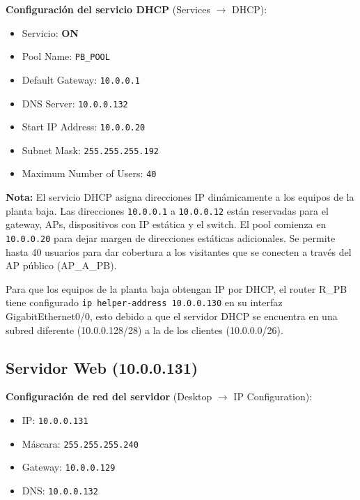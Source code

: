 \documentclass[letterpaper,11pt]{article}
\begin{document}
\textbf{Configuración del servicio DHCP} (Services $\rightarrow$ DHCP):
\begin{itemize}
    \item Servicio: \textbf{ON}
    \item Pool Name: \texttt{PB\_POOL}
    \item Default Gateway: \texttt{10.0.0.1}
    \item DNS Server: \texttt{10.0.0.132}
    \item Start IP Address: \texttt{10.0.0.20}
    \item Subnet Mask: \texttt{255.255.255.192}
    \item Maximum Number of Users: \texttt{40}
\end{itemize}

\textbf{Nota:} El servicio DHCP asigna direcciones IP dinámicamente a los equipos de la planta baja. Las direcciones \texttt{10.0.0.1} a \texttt{10.0.0.12} están reservadas para el gateway, APs, dispositivos con IP estática y el switch. El pool comienza en \texttt{10.0.0.20} para dejar margen de direcciones estáticas adicionales. Se permite hasta 40 usuarios para dar cobertura a los visitantes que se conecten a través del AP público (AP\_A\_PB).

Para que los equipos de la planta baja obtengan IP por DHCP, el router R\_PB tiene configurado \texttt{ip helper-address 10.0.0.130} en su interfaz GigabitEthernet0/0, esto debido a que el servidor DHCP se encuentra en una subred diferente (10.0.0.128/28) a la de los clientes (10.0.0.0/26).

\subsection{Servidor Web (10.0.0.131)}

\textbf{Configuración de red del servidor} (Desktop $\rightarrow$ IP Configuration):
\begin{itemize}
    \item IP: \texttt{10.0.0.131}
    \item Máscara: \texttt{255.255.255.240}
    \item Gateway: \texttt{10.0.0.129}
    \item DNS: \texttt{10.0.0.132}
\end{itemize}
\end{document}
